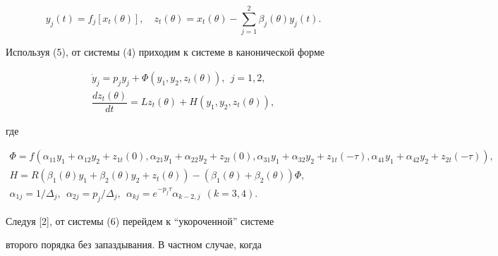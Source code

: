 \begin{equation} 


y_j(t)=f_j[x_t(\theta)],\quad 


z_t(\theta)=x_t(\theta)-\sum^2_{j=1}\beta_j(\theta)y_j(t). 


\end{equation} 


 


Используя (5), от системы (4) приходим к системе в канонической форме 


\begin{equation} 


\begin{array}{c} 


\Dot y_j=p_j y_j+\Phi(y_1,y_2,z_t(\theta)),\ \ j=1,2, \\[2mm] 


\dfrac{d z_t(\theta)}{d t}=L z_t(\theta)+ 


H(y_1,y_2,z_t(\theta)), 


\end{array} 


\end{equation} 


где 


\begin{gather*} 


\Phi=f(\alpha_{11}y_1+\alpha_{12}y_2+z_{1t}(0), 


\alpha_{21}y_1+\alpha_{22}y_2+z_{2t}(0),


\alpha_{31}y_1+\alpha_{32}y_2+z_{1t}(-\tau), 


\alpha_{41}y_1+\alpha_{42}y_2+z_{2t}(-\tau)), \\ 


% 


H=R(\beta_1(\theta)y_1+\beta_2(\theta)y_2+z_t(\theta))- 


(\beta_1(\theta)+\beta_2(\theta))\Phi, \\ 


% 


\alpha_{1j}=1/\Delta_j,\ \ \alpha_{2j}=p_j/\Delta_j, 


\ \ \alpha_{kj}=e^{-p_j\tau}\alpha_{k-2,j}\ \ (k=3,4). 


\end{gather*} 





Следуя [2], от системы (6) перейдем к ``укороченной'' системе 


второго порядка без запаздывания. В частном случае, когда 


